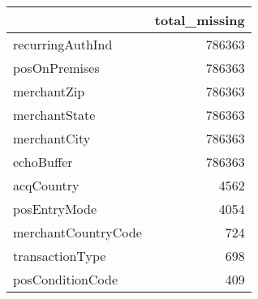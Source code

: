 \begin{tabu}{lr}
\toprule
 & total\_missing \\
\midrule
recurringAuthInd & 786363 \\
posOnPremises & 786363 \\
merchantZip & 786363 \\
merchantState & 786363 \\
merchantCity & 786363 \\
echoBuffer & 786363 \\
acqCountry & 4562 \\
posEntryMode & 4054 \\
merchantCountryCode & 724 \\
transactionType & 698 \\
posConditionCode & 409 \\
\bottomrule
\end{tabu}